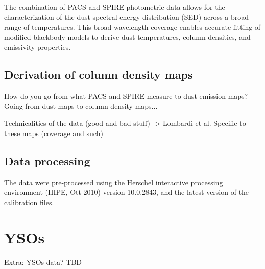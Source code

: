The combination of PACS and SPIRE photometric data allows for the characterization of the dust spectral energy distribution (SED) across a broad range of temperatures. This broad wavelength coverage enables accurate fitting of modified blackbody models to derive dust temperatures, column densities, and emissivity properties.

\subsection{Derivation of column density maps}
How do you go from what PACS and SPIRE measure to dust emission maps?
Going from dust maps to column density maps... 

Technicalities of the data (good and bad stuff) -> Lombardi et al.
Specific to these maps (coverage and such)

\subsection{Data processing}

The data were pre-processed using the Herschel interactive processing environment (HIPE, Ott 2010) version 10.0.2843, and the latest version of the calibration files.

\section{YSOs}
Extra: YSOs data? TBD

